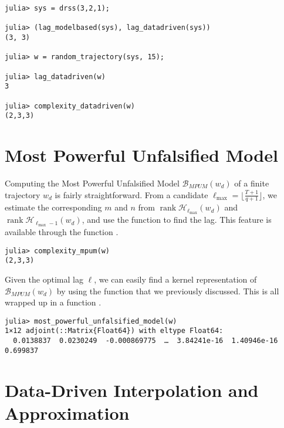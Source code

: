 \documentclass[11pt]{article}
\def\B{\mathscr{B}}
\def\rank{\operatorname{rank}}
\begin{document}
\begin{codebox}
\begin{verbatim}
julia> sys = drss(3,2,1);

julia> (lag_modelbased(sys), lag_datadriven(sys))
(3, 3)

julia> w = random_trajectory(sys, 15);

julia> lag_datadriven(w)
3

julia> complexity_datadriven(w)
(2,3,3)
\end{verbatim}
\end{codebox}

\section{Most Powerful Unfalsified Model}
Computing the Most Powerful Unfalsified Model $\B_{MPUM}(w_d)$ of a finite trajectory $w_d$ is fairly straightforward. From a candidate  $\ell_{\max} = \lfloor \frac{T+1}{q+1} \rfloor$, we estimate the corresponding $m$ and $n$ from $\rank \mathscr{H}_{\ell_{\max}} (w_d)$ and $\rank \mathscr{H}_{\ell_{\max}-1}(w_d)$, and use the  function to find the lag. This feature is available through the function .

\begin{codebox}
\begin{verbatim}
julia> complexity_mpum(w)
(2,3,3)  
\end{verbatim}
\end{codebox}

Given the optimal lag $\ell$, we can easily find a kernel representation of $\B_{MPUM}(w_d)$ by using the  function that we previously discussed. This is all wrapped up in a function .

\begin{codebox}
\begin{verbatim}
julia> most_powerful_unfalsified_model(w)
1×12 adjoint(::Matrix{Float64}) with eltype Float64:
  0.0138837  0.0230249  -0.000869775  …  3.84241e-16  1.40946e-16  0.699837
\end{verbatim}
\end{codebox}

\section{Data-Driven Interpolation and Approximation}
\end{document}
